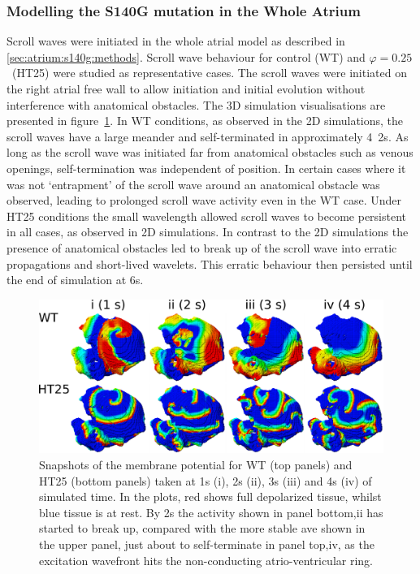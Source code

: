 \subsubsection{Modelling the S140G mutation in the Whole Atrium}

Scroll waves were initiated in the whole atrial model as described in
\ref{sec:atrium:s140g:methods}.
Scroll wave behaviour for control (WT) and $\varphi = 0.25$\ (HT25) were studied
as representative cases.
The scroll waves were initiated on the right atrial free wall to allow
initiation and initial evolution without interference with anatomical obstacles.
The 3D simulation visualisations are presented in
figure~\ref{atrium:iks:threed}.
In WT conditions, as observed in the 2D simulations, the scroll waves have a
large meander and self-terminated in approximately \unit{4.2}{s}.
As long as the scroll wave was initiated far from anatomical obstacles such as
venous openings, self-termination was independent of position.
In certain cases where it was not `entrapment' of the scroll wave around an
anatomical obstacle was observed, leading to prolonged scroll wave activity even
in the WT case.
Under HT25 conditions the small wavelength allowed scroll waves to become
persistent in all cases, as observed in 2D simulations.
In contrast to the 2D simulations the presence of anatomical obstacles led to break up of the
scroll wave into erratic propagations and short-lived wavelets.
This erratic behaviour then persisted until the end of simulation at
\unit{6}{s}.

\begin{figure}
\includegraphics{figures/atrium/iks/3D_Fig}
\caption[Snapshots of membrane potential over the whole atrium with S140G
mutation]{
\label{atrium:iks:threed}
Snapshots of the membrane potential for WT (top panels) and HT25 (bottom
panels) taken at \unit{1}{s} (i), \unit{2}{s} (ii), \unit{3}{s} (iii) and
\unit{4}{s} (iv) of simulated time.
In the plots, red shows full depolarized tissue, whilst blue tissue is at rest.
By \unit{2}{s} the activity shown in panel bottom,ii has started to break up, compared with
the more stable ave shown in the upper panel, just about to self-terminate in
panel top,iv, as the excitation wavefront hits the non-conducting atrio-ventricular
ring.
}
\end{figure}

